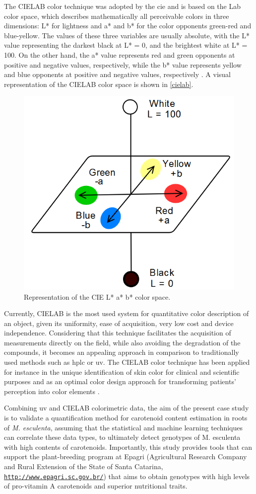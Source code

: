 The CIELAB color technique was adopted by the \gls{cie} and is based on the Lab color space, which describes mathematically all perceivable colors in three dimensions: L* for lightness and a* and b* for the color opponents green-red and blue-yellow. The values of these three variables are usually absolute, with the L* value representing the darkest black at L* = 0, and the brightest white at L* = 100. On the other hand, the a* value represents red and green opponents at positive and negative values, respectively, while the b* value represents yellow and blue opponents at positive and negative values, respectively \citep{brockes1982evaluation, schanda2007colorimetry}. A visual representation of the CIELAB color space is shown in \autoref{cielab}.

\begin{figure}[h]
	\centering
	\includegraphics[width=0.4\linewidth]{Imagens/cielab}
	\caption{Representation of the CIE L* a* b* color space.}
	\label{cielab}
\end{figure}

Currently, CIELAB is the most used system for quantitative color description of an object, given its uniformity, ease of acquisition, very low cost and device independence. Considering that this technique facilitates the acquisition of measurements directly on the field, while also avoiding the degradation of the compounds, it becomes an appealing approach in comparison to traditionally used methods such as \gls{hplc} or \gls{uv}. The CIELAB color technique has been applied for instance in the unique identification of skin color for clinical and scientific purposes \citep{weatherall1992skin} and as an optimal color design approach for transforming patients' perception into color elements \citep{liu2014optimal}.

Combining \gls{uv} and CIELAB colorimetric data, the aim of the present case study is to validate a quantification method for carotenoid content estimation in roots of \textit{M. esculenta}, assuming that the statistical and machine learning techniques can correlate these data types, to ultimately detect genotypes of M. esculenta with high contents of carotenoids. Importantly, this study provides tools that can support the plant-breeding program at Epagri (Agricultural Research Company and Rural Extension of the State of Santa Catarina, \href{http://www.epagri.sc.gov.br/}{\nolinkurl{http://www.epagri.sc.gov.br/}}) that aims to obtain genotypes with high levels of pro-vitamin A carotenoids and superior nutritional traits.


